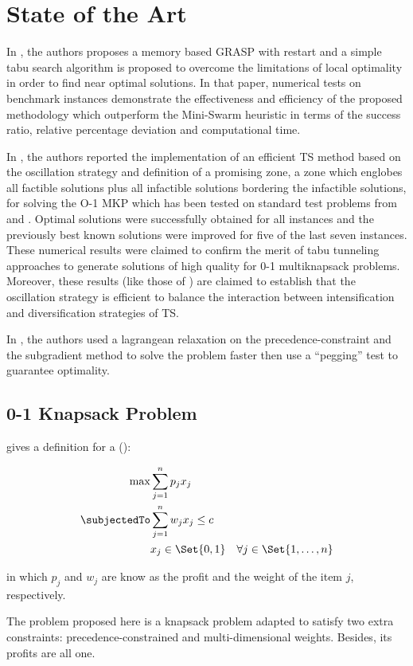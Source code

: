 \section{State of the Art}

In \cite{bib:grasp-and-tabu}, the authors proposes a memory based GRASP with restart and a simple tabu search algorithm is proposed to overcome the limitations of local optimality in order to find near optimal solutions. In that paper, numerical tests on benchmark instances demonstrate the effectiveness and efficiency of the proposed methodology which outperform the Mini-Swarm heuristic in terms of the success ratio, relative percentage deviation and computational time.

In \cite{bib:tabu-knapsack}, the authors reported the implementation of an efficient TS method based on the oscillation strategy and definition of a promising zone, a zone which englobes all factible solutions plus all infactible solutions bordering the infactible solutions, for solving the O-1 MKP which has been tested on standard test problems from \cite{bib:freville,bib:preprocessing-knapsack-1994} and \cite{bib:tabu-multidimensional-knapsack}. Optimal solutions were successfully obtained for all instances and the previously best known solutions were improved for five of the last seven instances. These numerical results were claimed to confirm the merit of tabu tunneling approaches to generate solutions of high quality for 0-1 multiknapsack problems. Moreover, these results (like those of \cite{bib:tabu-multidimensional-knapsack}) are claimed to establish that the oscillation strategy is efficient to balance the interaction between intensification and diversification strategies of TS.

In \cite{bib:constrained-knapsack}, the authors used a lagrangean relaxation on the precedence-constraint and the subgradient method to solve the problem faster then use a ``pegging'' test to guarantee optimality.


\subsection{0-1 Knapsack Problem}

\cite{bib:knapsack-problems} gives a definition for a \zoKPV (\zoKP):

\begin{eqnarray}
    \label{problem:knapsack-problem}
    \max & \displaystyle\sum\limits_{j=1}^{n} p_j x_j \\
    \subjectedTo
        & \displaystyle\sum\limits_{j=1}^{n} w_j x_j \leq c \nonumber\\
        & x_j \in \Set{0, 1} \quad \forall j \in \Set{1, \dots, n} \nonumber
\end{eqnarray}

in which $p_j$ and $w_j$ are know as the profit and the weight of the item $j$, respectively.

The problem proposed here is a knapsack problem adapted to satisfy two extra constraints: precedence-constrained and multi-dimensional weights. Besides, its profits are all one.
